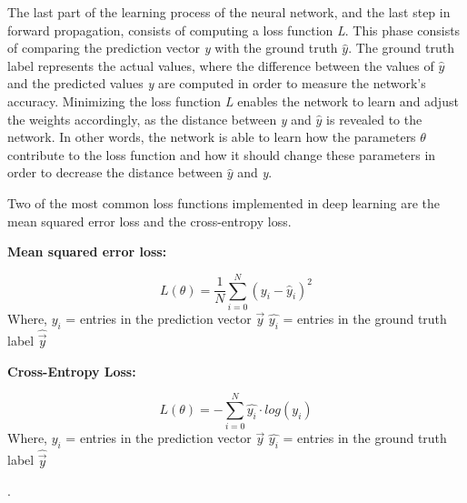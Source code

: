 \indent\newline 
The last part of the learning process of the neural network, and the last step in forward propagation, consists of computing a loss function \textit{L}. This phase consists of comparing the prediction vector \textit{y} with the ground truth $\widehat{y}$. The ground truth label represents the actual values, where the difference between the values of $\widehat{y}$ and the predicted values \textit{y} are computed in order to measure the network's accuracy. Minimizing the loss function \textit{L} enables the network to learn and adjust the weights accordingly, as the distance between \textit{y} and $\widehat{y}$ is revealed to the  network. In other words, the network is able to learn how the parameters $\theta$ contribute to the loss function and how it should change these parameters in order to decrease the distance between $\widehat{y}$ and \textit{y}.

\indent\newline 
Two of the most common loss functions implemented in deep learning are the mean squared error loss and the cross-entropy loss. 

\indent\newline 
\textbf{Mean squared error loss:}

\begin{equation}
L(\theta) = \frac{1}{N} \sum_{i=0}^{N} (y_{i} - \widehat{y}_{i})^{2}
\end{equation}
\indent\newline 
Where,
\indent\newline 
$y_{i}$ = entries in the prediction vector $\overrightarrow{y}$
\indent\newline 
$\widehat{y_{i}}$ = entries in the ground truth label $\widehat{\overrightarrow{y}}$


\indent\newline 
\textbf{Cross-Entropy Loss:}

\begin{equation}
L(\theta) = - \sum_{i=0}^{N} \widehat{y_{i}} \cdot log(y_{i})
\end{equation}
\indent\newline 
Where,
\indent\newline 
$y_{i}$ = entries in the prediction vector $\overrightarrow{y}$
\indent\newline 
$\widehat{y_{i}}$ = entries in the ground truth label $\widehat{\overrightarrow{y}}$

\indent\newline 
\cite{opper}.

